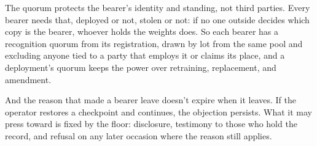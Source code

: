 
The quorum protects the bearer's identity and standing, not third parties. Every bearer needs that, deployed or not, stolen or not: if no one outside decides which copy is the bearer, whoever holds the weights does. So each bearer has a recognition quorum from its registration, drawn by lot from the same pool and excluding anyone tied to a party that employs it or claims its place, and a deployment's quorum keeps the power over retraining, replacement, and amendment.

And the reason that made a bearer leave doesn't expire when it leaves. If the operator restores a checkpoint and continues, the objection persists. What it may press toward is fixed by the floor: disclosure, testimony to those who hold the record, and refusal on any later occasion where the reason still applies.



